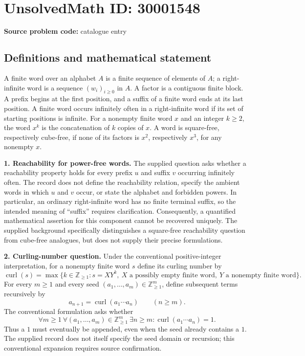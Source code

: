 \documentclass[11pt]{article}
\begin{document}
\section*{UnsolvedMath ID: 30001548}
\textbf{Source problem code:} catalogue entry
\subsection{Definitions and mathematical statement}
A finite word over an alphabet $A$ is a finite sequence of elements of $A$; a right-infinite word is a sequence $(w_i)_{i\geq 0}$ in $A$. A factor is a contiguous finite block. A prefix begins at the first position, and a suffix of a finite word ends at its last position. A finite word occurs infinitely often in a right-infinite word if its set of starting positions is infinite. For a nonempty finite word $x$ and an integer $k\geq 2$, the word $x^k$ is the concatenation of $k$ copies of $x$. A word is square-free, respectively cube-free, if none of its factors is $x^2$, respectively $x^3$, for any nonempty $x$.

\textbf{1. Reachability for power-free words.} The supplied question asks whether a reachability property holds for every prefix $u$ and suffix $v$ occurring infinitely often. The record does not define the reachability relation, specify the ambient words in which $u$ and $v$ occur, or state the alphabet and forbidden powers. In particular, an ordinary right-infinite word has no finite terminal suffix, so the intended meaning of ``suffix'' requires clarification. Consequently, a quantified mathematical assertion for this component cannot be recovered uniquely. The supplied background specifically distinguishes a square-free reachability question from cube-free analogues, but does not supply their precise formulations.

\textbf{2. Curling-number question.} Under the conventional positive-integer interpretation, for a nonempty finite word $s$ define its curling number by
\[
\operatorname{curl}(s)=\max\{k\in\mathbb Z_{\geq 1}:s=XY^k,\ X\text{ a possibly empty finite word},\ Y\text{ a nonempty finite word}\}.
\]
For every $m\geq 1$ and every seed $(a_1,\ldots,a_m)\in\mathbb Z_{\geq 1}^{m}$, define subsequent terms recursively by
\[
 a_{n+1}=\operatorname{curl}(a_1\cdots a_n)\qquad(n\geq m).
\]
The conventional formulation asks whether
\[
\forall m\geq 1\ \forall(a_1,\ldots,a_m)\in\mathbb Z_{\geq 1}^{m}\ \exists n\geq m:
\operatorname{curl}(a_1\cdots a_n)=1.
\]
Thus a $1$ must eventually be appended, even when the seed already contains a $1$. The supplied record does not itself specify the seed domain or recursion; this conventional expansion requires source confirmation.
\end{document}
